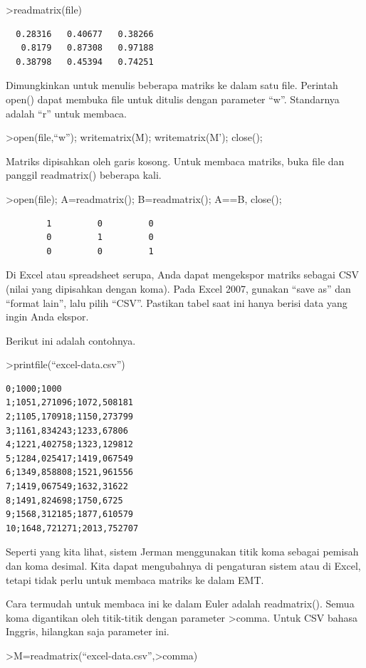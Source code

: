 \documentclass[
]{book}
\begin{document}
\textgreater readmatrix(file)

\begin{verbatim}
  0.28316   0.40677   0.38266 
   0.8179   0.87308   0.97188 
  0.38798   0.45394   0.74251 
\end{verbatim}

Dimungkinkan untuk menulis beberapa matriks ke dalam satu file. Perintah open() dapat membuka file untuk ditulis dengan parameter ``w''. Standarnya adalah ``r'' untuk membaca.

\textgreater open(file,``w''); writematrix(M); writematrix(M'); close();

Matriks dipisahkan oleh garis kosong. Untuk membaca matriks, buka file dan panggil readmatrix() beberapa kali.

\textgreater open(file); A=readmatrix(); B=readmatrix(); A==B, close();

\begin{verbatim}
        1         0         0 
        0         1         0 
        0         0         1 
\end{verbatim}

Di Excel atau spreadsheet serupa, Anda dapat mengekspor matriks sebagai CSV (nilai yang dipisahkan dengan koma). Pada Excel 2007, gunakan ``save as'' dan ``format lain'', lalu pilih ``CSV''. Pastikan tabel saat ini hanya berisi data yang ingin Anda ekspor.

Berikut ini adalah contohnya.

\textgreater printfile(``excel-data.csv'')

\begin{verbatim}
0;1000;1000
1;1051,271096;1072,508181
2;1105,170918;1150,273799
3;1161,834243;1233,67806
4;1221,402758;1323,129812
5;1284,025417;1419,067549
6;1349,858808;1521,961556
7;1419,067549;1632,31622
8;1491,824698;1750,6725
9;1568,312185;1877,610579
10;1648,721271;2013,752707
\end{verbatim}

Seperti yang kita lihat, sistem Jerman menggunakan titik koma sebagai pemisah dan koma desimal. Kita dapat mengubahnya di pengaturan sistem atau di Excel, tetapi tidak perlu untuk membaca matriks ke dalam EMT.

Cara termudah untuk membaca ini ke dalam Euler adalah readmatrix(). Semua koma digantikan oleh titik-titik dengan parameter \textgreater comma. Untuk CSV bahasa Inggris, hilangkan saja parameter ini.

\textgreater M=readmatrix(``excel-data.csv'',\textgreater comma)
\end{document}
